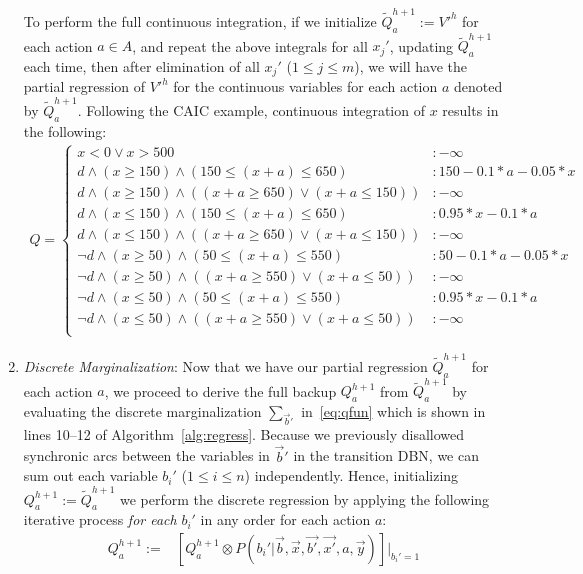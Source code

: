 \documentclass[twoside,11pt]{article}
\begin{document}
\begin{enumerate}
To perform the full continuous integration, 
if we initialize 
$\tilde{Q}_a^{h+1} := V'^{h}$ for each action $a \in A$, and repeat
the above integrals for all $x_j'$, updating $\tilde{Q}_a^{h+1}$ each time,
then after elimination of all $x_j'$ ($1 \leq j \leq m$), we will have 
the partial regression of $V'^{h}$ for the continuous variables for
each action $a$ denoted by $\tilde{Q}_a^{h+1}$. Following the \textsc{CAIC} example, continuous integration of $x$ results in the following: 
{\footnotesize
\begin{align}
Q = \begin{cases}
x < 0 \vee x>500 &: -\infty \\
d \land (x \geq 150) \land (150 \leq (x+a) \leq 650) &:  150 - 0.1 * a - 0.05 * x \\
d \land (x \geq 150) \land ((x+a \geq 650) \vee (x+a \leq 150)) &:  -\infty \\
d \land (x \leq 150) \land (150 \leq (x+a) \leq 650)&:  0.95 * x - 0.1 * a \\
d \land (x \leq 150) \land ((x+a \geq 650) \vee (x+a \leq 150)) &:  -\infty \\
\neg d \land (x \geq 50) \land (50 \leq (x+a) \leq 550)  &:  50 - 0.1 * a - 0.05 * x \\
\neg d \land (x \geq 50) \land ((x+a \geq 550) \vee (x+a \leq 50)) &:  -\infty \\
\neg d \land (x \leq 50) \land (50 \leq (x+a) \leq 550) &:  0.95 * x - 0.1 * a \\
\neg d \land (x \leq 50) \land ((x+a \geq 550) \vee (x+a \leq 50)) &:  -\infty \\
\end{cases} \label{recent_q}
\end{align}
}
\item {\it Discrete Marginalization}: Now that we have our partial
regression $\tilde{Q}_a^{h+1}$ for each action $a$, we proceed
to derive the full backup $Q_a^{h+1}$ from $\tilde{Q}_a^{h+1}$
by evaluating the discrete 
marginalization $\sum_{\vec{b}'}$ in~\eqref{eq:qfun} which is shown in lines 10--12 of Algorithm~\ref{alg:regress}.
Because we previously disallowed synchronic arcs
between the variables in $\vec{b}'$ 
in the transition DBN, we can sum out each variable $b_i'$ ($1 \leq i \leq n$) 
independently.  Hence, initializing
$Q_a^{h+1} := \tilde{Q}_a^{h+1}$
we perform the discrete regression by applying the following iterative
process \emph{for each} $b_i'$ in any order for each action $a$:
\begin{align*}
Q_a^{h+1} := & \left[ Q_a^{h+1} \otimes P(b_i'|\vec{b},\vec{x},\vec{b'},\vec{x'},a,\vec{y}) \right]|_{b_i' = 1} 

\end{align*}
\end{enumerate}
\end{document}
